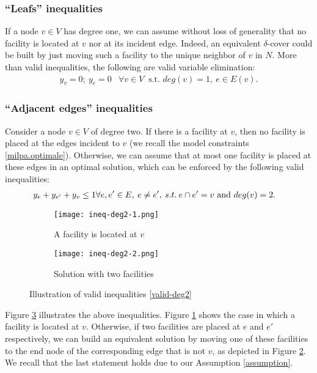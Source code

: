 \documentclass[review]{elsarticle}
\newcommand{\st}{{\text{ s.t. }}}
\newcommand{\dlt}{{\delta}}
\theoremstyle{definition}
\begin{document}
\subsubsection*{``Leafs'' inequalities}
If a node $v\in V$ has degree one, we can assume without loss of generality that no facility is located at $v$ nor at its incident edge. Indeed, an equivalent $\dlt$-cover could be built by just moving such a facility to the unique neighbor of $v$ in $N$. More than valid inequalities, the following are valid variable elimination:
\begin{eqnarray}
y_v=0;\: y_e=0 & \forall  v \in V \: \st deg(v)=1, \: e\in E(v).\label{const-valid2}
\end{eqnarray}

\subsubsection*{``Adjacent edges'' inequalities}
Consider a node $v\in V$ of degree two. If there is a facility at $v$, then no facility is placed at the edges incident to $v$ (we recall the model constraints \eqref{milpa.optimale}). Otherwise, we can assume that at most one facility is placed at these edges in an optimal solution, which can be enforced by the following valid inequalities:
\begin{eqnarray}
y_e+y_{e'}+y_{v}\leq 1 & \forall  e,e'\in E, \: e\neq e',\: s.t. \: e\cap e'=v \textup{ and } deg(v)=2.\label{valid-deg2}
\end{eqnarray}
\begin{figure}
	\begin{subfigure}{0.5\textwidth}
    	\centering
    	\texttt{[image: ineq-deg2-1.png]}
    	\caption{A facility is located at $v$}
    	\label{fig:degree2a}
	\end{subfigure}
 	\begin{subfigure}{0.5\textwidth}
    	\centering
    	\texttt{[image: ineq-deg2-2.png]}
    	\caption{Solution with two facilities}
    	\label{fig:degree2b}
	\end{subfigure}
	\caption{Illustration of valid inequalities \eqref{valid-deg2}}
	\label{fig:degree2}
\end{figure}
Figure \ref{fig:degree2} illustrates the above inequalities. Figure \ref{fig:degree2a} shows the case in which a facility is located at $v$. Otherwise, if two facilities are placed at $e$ and $e'$ respectively, we can build an equivalent solution by moving one of these facilities to the end node of the corresponding edge that is not $v$, as depicted in Figure \ref{fig:degree2b}. We recall that the last statement holds due to our Assumption \ref{assumption}.
\end{document}
